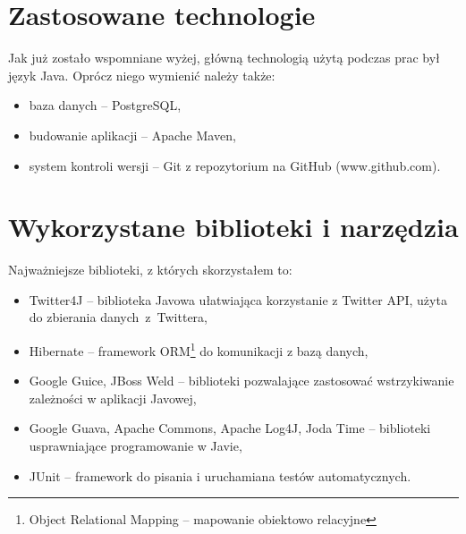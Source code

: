 \section{Zastosowane technologie}
\label{section:zastosowanetechnologie}
Jak już zostało wspomniane wyżej, główną technologią użytą podczas prac był
język Java. Oprócz niego wymienić należy także:
\begin{itemize}
  \item baza danych -- PostgreSQL,
  \item budowanie aplikacji -- Apache Maven,
  \item system kontroli wersji -- Git z repozytorium na GitHub (www.github.com).
\end{itemize}
\section{Wykorzystane biblioteki i narzędzia}
\label{section:bibliotekiinarzedzia}
Najważniejsze biblioteki, z których skorzystałem to:
\begin{itemize}
  \item Twitter4J -- biblioteka Javowa ułatwiająca korzystanie z Twitter API,
  użyta do zbierania \mbox{danych z Twittera,}
  \item Hibernate -- framework ORM\footnote{Object Relational Mapping --
  mapowanie obiektowo relacyjne} do komunikacji z bazą danych,
  \item Google Guice, JBoss Weld -- biblioteki pozwalające zastosować
  wstrzykiwanie zależności w aplikacji Javowej,
  \item Google Guava, Apache Commons, Apache Log4J, Joda Time -- biblioteki
  usprawniające programowanie w Javie,
  \item JUnit -- framework do pisania i uruchamiana testów automatycznych.
\end{itemize}